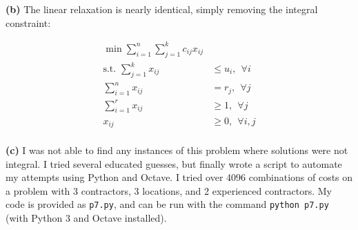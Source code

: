 \documentclass[fleqn]{homework}
\begin{document}
\begin{problem}{7}
    \textbf{(b)} The linear relaxation is nearly identical, simply removing the
    integral constraint:

    \begin{align*}
      \min \sum_{i=1}^n \sum_{j=1}^k c_{ij} x_{ij} & \\
      \text{s.t. } \sum_{j=1}^k x_{ij} &\leq u_i, \:\: \forall i \\
      \sum_{i=1}^n x_{ij} &= r_j, \:\: \forall j \\
      \sum_{i=1}^r x_{ij} &\geq 1, \:\: \forall j \\
      x_{ij} &\geq 0, \:\: \forall i,j \\
    \end{align*}

    \textbf{(c)} I was not able to find any instances of this problem where
    solutions were not integral.  I tried several educated guesses, but finally
    wrote a script to automate my attempts using Python and Octave.  I tried
    over 4096 combinations of costs on a problem with 3 contractors, 3
    locations, and 2 experienced contractors.  My code is provided as
    \texttt{p7.py}, and can be run with the command \texttt{python p7.py} (with
    Python 3 and Octave installed).
  \end{problem}
\end{document}
